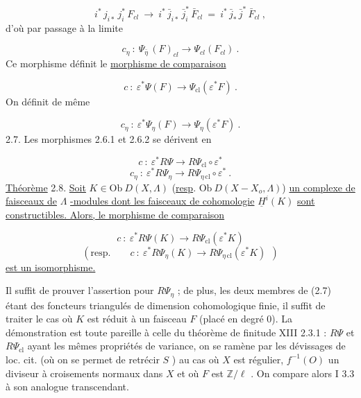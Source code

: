 \begin{equation*}
i^* \, j_{i*} \, j_i^* \, F_{cl} \ \longrightarrow \ i^* \, \bar{j}_{i*} \, \bar{j}_i^* \, \bar{F}_{cl} \ = \ i^* \, \bar{j}_* \, \bar{j}^* \, \bar{F}_{cl} \ ,
\end{equation*}
d'où par passage à la limite

\begin{equation*}
c_\eta \ : \ \Psi_{\bar{\eta}} \, (F)_{cl} \longrightarrow \Psi_{cl}(F_{cl}) \ .
\end{equation*}
Ce morphisme définit le \underline{morphisme de comparaison} 



\begin{equation}\tag{2.6.1}
c \ : \ \varepsilon^* \Psi(F) \longrightarrow \Psi_{\mathrm{cl}}(\varepsilon^* F) \ .
\end{equation}
On définit de même

\begin{equation}\tag{2.6.2}
c_\eta \ : \ \varepsilon^* \Psi_\eta(F) \longrightarrow \Psi_\eta(\varepsilon^* F) \ .
\end{equation}
2.7. Les morphismes 2.6.1 et 2.6.2 se dérivent en

\begin{equation*}
c \ : \ \varepsilon^* R\Psi \longrightarrow R\Psi_{\mathrm{cl}} \circ \varepsilon^*
\end{equation*}
\begin{equation*}
c_\eta \ : \ \varepsilon^* R\Psi_\eta \longrightarrow R\Psi_{\eta\,\mathrm{cl}} \circ \varepsilon^* \ .
\end{equation*}
\underline{Théorème} 2.8. \underline{Soit} $K \in \mathrm{Ob}\ D(X, \Lambda)$ (\underline{resp}. $\mathrm{Ob}\ D(X-X_o, \Lambda)$) \underline{un complexe de faisceaux de} $\Lambda$ \underline{-modules dont les faisceaux de cohomologie} $\underline{H}^i(K)$ \underline{sont constructibles. Alors, le morphisme de comparaison}

\begin{equation*}
c \ : \ \varepsilon^* R\Psi(K) \longrightarrow R\Psi_{\mathrm{cl}}(\varepsilon^* K)
\end{equation*}
\begin{equation*}
(\mathrm{resp.} \qquad c \ : \ \varepsilon^* R\Psi_\eta(K) \longrightarrow R\Psi_{\eta\,\mathrm{cl}}(\varepsilon^* K) \ \ )
\end{equation*}
\underline{est un isomorphisme.}

Il suffit de prouver l'assertion pour $R\Psi_\eta$ ; de plus, les deux membres de (2.7) étant des foncteurs triangulés de dimension cohomologique finie, il suffit de traiter le cas où $K$ est réduit à un faisceau $F$ (placé en degré $0$). La démonstration est toute pareille à celle du théorème de finitude XIII 2.3.1 : $R\Psi$ et $R\Psi_{\mathrm{cl}}$ ayant les mêmes propriétés de variance, on se ramène par les dévissages de loc. cit. (où on se permet de retrécir $S$ ) au cas où $X$ est régulier, $f^{-1}(O)$ un diviseur à croisements normaux dans $X$ et où $F$ est $\mathbb{Z}/\ell$ . On compare alors I 3.3 à son analogue transcendant.


